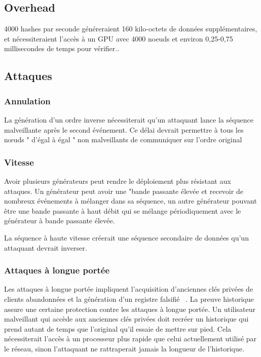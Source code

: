 \documentclass[12pt]{article}
\begin{document}
\subsection{Overhead}
4000 hashes par seconde généreraient 160 kilo-octets de données supplémentaires, et nécessiteraient l'accès à un GPU avec 4000 noeuds et environ 0,25-0,75 millisecondes de temps pour vérifier..

\subsection{Attaques}
\subsubsection{Annulation}
 La génération d'un ordre inverse nécessiterait qu'un attaquant lance la séquence malveillante après le second événement. Ce délai devrait permettre à tous les nœuds  " d’égal à égal "  non malveillants de communiquer sur l'ordre original

\subsubsection{Vitesse}
Avoir plusieurs générateurs peut rendre le déploiement plus résistant aux attaques. Un générateur peut avoir une "bande passante élevée et recevoir de nombreux événements à mélanger dans sa séquence, un autre générateur pouvant être une bande passante à haut débit qui se mélange périodiquement avec le générateur à bande passante élevée.

La séquence à haute vitesse créerait une séquence secondaire de données qu'un attaquant devrait inverser.

\subsubsection{Attaques à longue portée}

Les attaques à longue portée impliquent l'acquisition d’anciennes clés privées de clients abandonnées et la génération d'un registre falsifié ~\cite{casper}. La preuve historique assure une certaine protection contre les attaques à longue portée. Un utilisateur malveillant qui accède aux anciennes clés privées doit recréer un historique qui prend autant de temps que l'original qu'il essaie de mettre sur pied.  Cela nécessiterait l'accès à un processeur plus rapide que celui actuellement utilisé par le réseau, sinon l'attaquant ne rattraperait jamais la longueur de l'historique.
\end{document}
